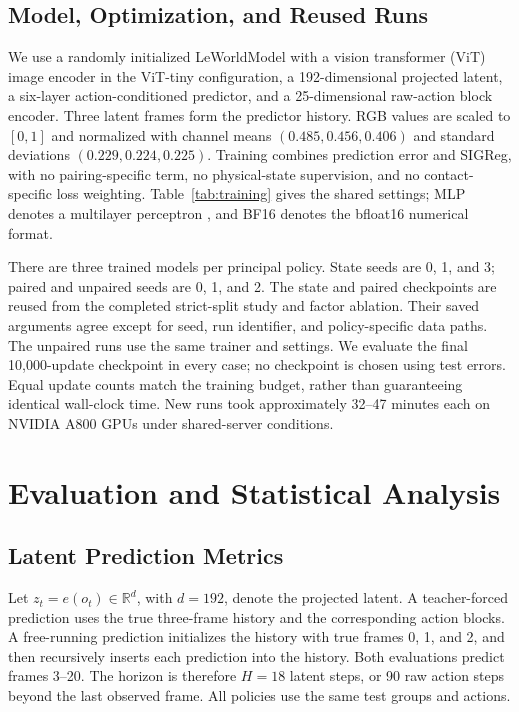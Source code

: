 \subsection{Model, Optimization, and Reused Runs}
We use a randomly initialized LeWorldModel with a vision transformer (ViT) image encoder \cite{dosovitskiy2021vit} in the ViT-tiny configuration, a 192-dimensional projected latent, a six-layer action-conditioned predictor, and a 25-dimensional raw-action block encoder. Three latent frames form the predictor history. RGB values are scaled to $[0,1]$ and normalized with channel means $(0.485,0.456,0.406)$ and standard deviations $(0.229,0.224,0.225)$. Training combines prediction error and SIGReg, with no pairing-specific term, no physical-state supervision, and no contact-specific loss weighting. Table~\ref{tab:training} gives the shared settings; MLP denotes a multilayer perceptron \cite{goodfellow2016deeplearning}, and BF16 denotes the bfloat16 numerical format.

There are three trained models per principal policy. State seeds are 0, 1, and 3; paired and unpaired seeds are 0, 1, and 2. The state and paired checkpoints are reused from the completed strict-split study and factor ablation. Their saved arguments agree except for seed, run identifier, and policy-specific data paths. The unpaired runs use the same trainer and settings. We evaluate the final 10,000-update checkpoint in every case; no checkpoint is chosen using test errors. Equal update counts match the training budget, rather than guaranteeing identical wall-clock time. New runs took approximately 32--47 minutes each on NVIDIA A800 GPUs under shared-server conditions.



\section{Evaluation and Statistical Analysis}
\subsection{Latent Prediction Metrics}
Let $z_t=e(o_t)\in\mathbb{R}^{d}$, with $d=192$, denote the projected latent. A teacher-forced prediction uses the true three-frame history and the corresponding action blocks. A free-running prediction initializes the history with true frames 0, 1, and 2, and then recursively inserts each prediction into the history. Both evaluations predict frames 3--20. The horizon is therefore $H=18$ latent steps, or 90 raw action steps beyond the last observed frame. All policies use the same test groups and actions.


